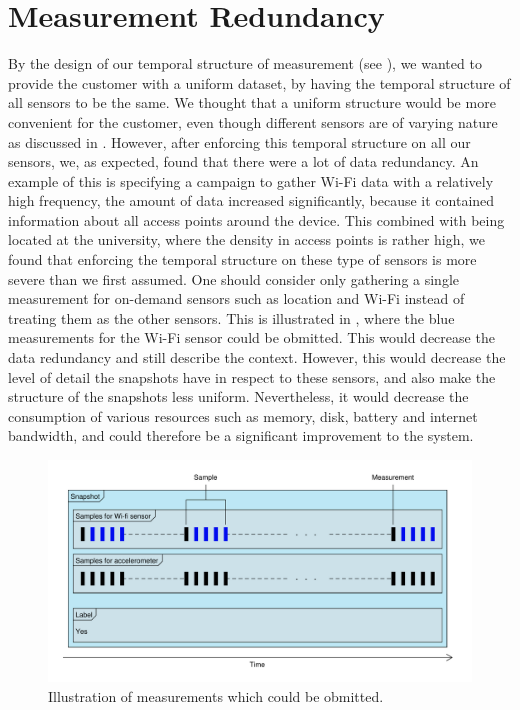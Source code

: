 
\section{Measurement Redundancy}
\label{sec:measurement_redundancy}

By the design of our temporal structure of measurement (see ), we wanted to provide the customer with a uniform dataset, by having the temporal structure of all sensors to be the same. We thought that a uniform structure would be more convenient for the customer, even though different sensors are of varying nature as discussed in . However, after enforcing this temporal structure on all our sensors, we, as expected, found that there were a lot of data redundancy. An example of this is specifying a campaign to gather Wi-Fi data with a relatively high frequency, the amount of data increased significantly, because it contained information about all access points around the device. This combined with being located at the university, where the density in access points is rather high, we found that enforcing the temporal structure on these type of sensors is more severe than we first assumed. One should consider only gathering a single measurement for on-demand sensors such as location and Wi-Fi instead of treating them as the other sensors. This is illustrated in , where the blue measurements for the Wi-Fi sensor could be obmitted. This would decrease the data redundancy and still describe the context. However, this would decrease the level of detail the snapshots have in respect to these sensors, and also make the structure of the snapshots less uniform. Nevertheless, it would decrease the consumption of various resources such as memory, disk, battery and internet bandwidth, and could therefore be a significant improvement to the system. 

\begin{figure}[!htbp]
    \centering
    \includegraphics[width=\textwidth]{graphic/reflection/snapshot}
    \caption{Illustration of measurements which could be obmitted.}
    \label{fig:new_snapshot}
\end{figure}
\FloatBarrier